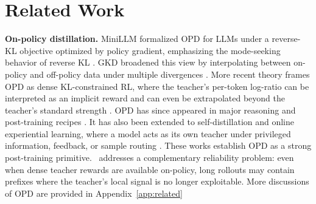 \section{Related Work}


\noindent\textbf{On-policy distillation.}
MiniLLM formalized OPD for LLMs under a reverse-KL objective optimized by policy gradient, emphasizing the mode-seeking behavior of reverse KL \citep{gu2024minillm}.
GKD broadened this view by interpolating between on-policy and off-policy data under multiple divergences \citep{agarwal2024policy}.
More recent theory frames OPD as dense KL-constrained RL, where the teacher's per-token log-ratio can be interpreted as an implicit reward and can even be extrapolated beyond the teacher's standard strength \citep{yang2026learning}.
OPD has since appeared in major reasoning and post-training recipes \citep{yang2025qwen3,lu2025onpolicydistillation,zeng2026glm,xiao2026mimo,ko2026scaling,jin2026entropy,jang2026stable,fu2026revisiting,yang2026learning,gu2026coevolvingpolicydistillation}.
It has also been extended to self-distillation and online experiential learning, where a model acts as its own teacher under privileged information, feedback, or sample routing \citep{hubotter2026reinforcement,zhao2026self,he2026far,shenfeld2026self,ye2026policy,sang2026crispcompressedreasoningiterative,kim2026does,ye2026online,yang2026self,li2026unifying,zhao2026selfdistillationmultitokenprediction,ding2026hdpo,song2026ehrag}.
These works establish OPD as a strong post-training primitive.
\method~addresses a complementary reliability problem: even when dense teacher rewards are available on-policy, long rollouts may contain prefixes where the teacher's local signal is no longer exploitable. More discussions of OPD are provided in Appendix~\ref{app:related} 



\vspace{-5mm}
